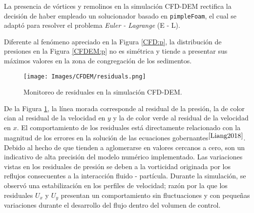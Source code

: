 \noindent
\justify

La presencia de v\'ortices y remolinos en la simulaci\'on CFD-DEM rectifica la decisi\'on de haber empleado un solucionador basado en \texttt{pimpleFoam}, el cual se adapt\'o para resolver el problema \textit{Euler - Lagrange} (E - L).

\noindent
\justify

Diferente al fen\'omeno apreciado en la Figura \ref{CFD:p}, la distribuci\'on de presiones en la Figura \ref{CFDEM:p} no es sim\'etrica y tiende a presentar sus m\'aximos valores en la zona de congregaci\'on de los sedimentos.

\begin{figure}[h!]
	\centering
	\texttt{[image: Images/CFDEM/residuals.png]}
	\caption{Monitoreo de residuales en la simulaci\'on CFD-DEM.}
	\label{CFDEM:residuals}
\end{figure}

\noindent
\justify

De la Figura \ref{CFDEM:residuals}, la l\'inea morada corresponde al residual de la presi\'on, la de color cian al residual de la velocidad en $y$ y la de color verde al residual de la velocidad en $x$. El comportamiento de los residuales est\'a directamente relacionado con la magnitud de los errores en la soluci\'on de las ecuaciones gobernantes$^{\cite{Liang2018}}$. Debido al hecho de que tienden a aglomerarse en valores cercanos a cero, son un indicativo de alta precisi\'on del modelo num\'erico implementado. Las variaciones vistas en los residuales de presi\'on se deben a la vorticidad originada por los reflujos consecuentes a la interacci\'on fluido - part\'icula. Durante la simulaci\'on, se observ\'o una estabilizaci\'on en los perfiles de velocidad; raz\'on por la que los residuales $U_x$ y $U_y$ presentan un comportamiento sin fluctuaciones y con peque\~nas variaciones durante el desarrollo del flujo dentro del volumen de control.